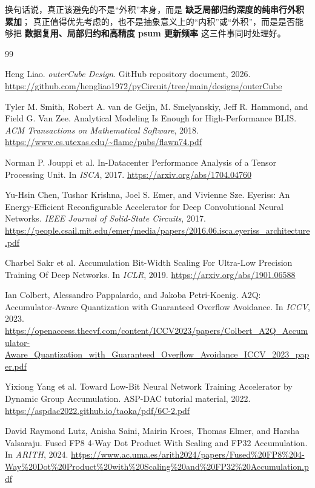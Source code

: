 \documentclass[UTF8,11pt,a4paper]{ctexart}
\begin{document}
换句话说，真正该避免的不是“外积”本身，而是 \textbf{缺乏局部归约深度的纯串行外积累加}；
真正值得优先考虑的，也不是抽象意义上的“内积”或“外积”，而是是否能够把
\textbf{数据复用、局部归约和高精度 psum 更新频率} 这三件事同时处理好。

\begin{thebibliography}{99}

Heng Liao.
\newblock \emph{outerCube Design}.
\newblock GitHub repository document, 2026.
\newblock \url{https://github.com/hengliao1972/pyCircuit/tree/main/designs/outerCube}

Tyler M. Smith, Robert A. van de Geijn, M. Smelyanskiy, Jeff R. Hammond, and Field G. Van Zee.
\newblock Analytical Modeling Is Enough for High-Performance BLIS.
\newblock \emph{ACM Transactions on Mathematical Software}, 2018.
\newblock \url{https://www.cs.utexas.edu/~flame/pubs/flawn74.pdf}

Norman P. Jouppi et al.
\newblock In-Datacenter Performance Analysis of a Tensor Processing Unit.
\newblock In \emph{ISCA}, 2017.
\newblock \url{https://arxiv.org/abs/1704.04760}

Yu-Hsin Chen, Tushar Krishna, Joel S. Emer, and Vivienne Sze.
\newblock Eyeriss: An Energy-Efficient Reconfigurable Accelerator for Deep Convolutional Neural Networks.
\newblock \emph{IEEE Journal of Solid-State Circuits}, 2017.
\newblock \url{https://people.csail.mit.edu/emer/media/papers/2016.06.isca.eyeriss_architecture.pdf}

Charbel Sakr et al.
\newblock Accumulation Bit-Width Scaling For Ultra-Low Precision Training Of Deep Networks.
\newblock In \emph{ICLR}, 2019.
\newblock \url{https://arxiv.org/abs/1901.06588}

Ian Colbert, Alessandro Pappalardo, and Jakoba Petri-Koenig.
\newblock A2Q: Accumulator-Aware Quantization with Guaranteed Overflow Avoidance.
\newblock In \emph{ICCV}, 2023.
\newblock \url{https://openaccess.thecvf.com/content/ICCV2023/papers/Colbert_A2Q_Accumulator-Aware_Quantization_with_Guaranteed_Overflow_Avoidance_ICCV_2023_paper.pdf}

Yixiong Yang et al.
\newblock Toward Low-Bit Neural Network Training Accelerator by Dynamic Group Accumulation.
\newblock ASP-DAC tutorial material, 2022.
\newblock \url{https://aspdac2022.github.io/taoka/pdf/6C-2.pdf}

David Raymond Lutz, Anisha Saini, Mairin Kroes, Thomas Elmer, and Harsha Valsaraju.
\newblock Fused FP8 4-Way Dot Product With Scaling and FP32 Accumulation.
\newblock In \emph{ARITH}, 2024.
\newblock \url{https://www.ac.uma.es/arith2024/papers/Fused%20FP8%204-Way%20Dot%20Product%20with%20Scaling%20and%20FP32%20Accumulation.pdf}


\end{thebibliography}
\end{document}
